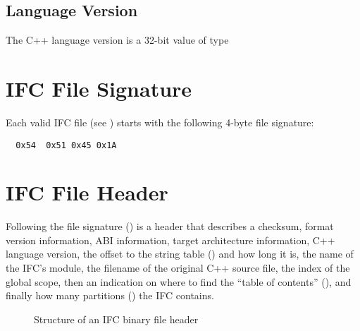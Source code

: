 \subsection{Language Version}
\label{sec:ifc-language-version}

The C++ language version is a 32-bit value of type 

\section{IFC File Signature}
\label{sec:ifc-file-signature}

Each valid IFC file (see ) starts with the following 4-byte file signature:
\begin{lstlisting}
  0x54  0x51 0x45 0x1A
\end{lstlisting}


\section{IFC File Header}
\label{sec:ifc-file-header}

Following the file signature () is a header that describes a checksum, 
format version information, ABI information, target architecture information, C++ language version,
 the offset to the string table () and how long it is, 
the name of the IFC's module, the filename of the original C++ source file, the index of the global scope,
then an indication on
where to find the ``table of contents'' (), and finally how many partitions ()
the IFC contains.
%
\begin{figure}[H]
  \centering
  \caption{Structure of an IFC binary file header}
  \label{fig:ifc-file-header}
\end{figure}

